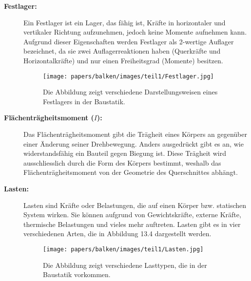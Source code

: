 \begin{description}
\item[\textbf{Festlager:}] Ein Festlager ist ein Lager, das fähig ist, Kräfte in horizontaler und vertikaler Richtung aufzunehmen, jedoch keine Momente aufnehmen kann.
%
Aufgrund dieser Eigenschaften werden Festlager als 2-wertige Auflager bezeichnet, da sie zwei Auflagerreaktionen haben (Querkräfte und Horizontalkräfte) und nur einen Freiheitsgrad (Momente) besitzen.
\begin{figure}
	\centering
	\texttt{[image: papers/balken/images/teil1/Festlager.jpg]}
	\caption{Die Abbildung zeigt verschiedene Darstellungsweisen eines Festlagers in der Baustatik.}
	\label{fig:Die Abbildung zeigt verschiedene Darstellungsweisen eines Festlagers in der Baustatik.}
\end{figure}

\item[\textbf{Flächenträgheitsmoment ($I$):}] Das Flächenträgheitsmoment gibt die Trägheit eines Körpers an gegenüber einer Änderung seiner Drehbewegung.
%
Anders ausgedrückt gibt es an, wie widerstandsfähig ein Bauteil gegen Biegung ist.
Diese Trägheit wird ausschliesslich durch die Form des Körpers bestimmt, weshalb das Flächenträgheitsmoment von der Geometrie des Querschnittes abhängt.

\item[\textbf{Lasten:}] Lasten sind Kräfte oder Belastungen, die auf einen Körper bzw. statischen System wirken.
%
Sie können aufgrund von Gewichtskräfte, externe Kräfte, thermische Belastungen und vieles mehr auftreten.
Lasten gibt es in vier verschiedenen Arten, die in Abbildung 13.4 dargestellt werden.
\begin{figure}
	\centering
	\texttt{[image: papers/balken/images/teil1/Lasten.jpg]}
	\caption{Die Abbildung zeigt verschiedene Lasttypen, die in der Baustatik vorkommen.}
	\label{fig:Die Abbildung zeigt verschiedene Lasttypen, die in der Baustatik vorkommen.}
\end{figure}


\end{description}
